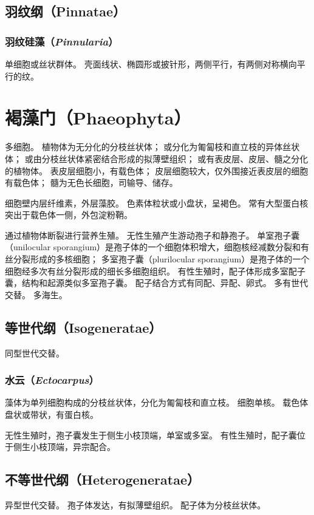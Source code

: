 \documentclass[11pt]{article}
\begin{document}
\subsection{羽纹纲（Pinnatae）}
\subsubsection{羽纹硅藻（\textit{Pinnularia}）}
单细胞或丝状群体。
壳面线状、椭圆形或披针形，两侧平行，有两侧对称横向平行的纹。

\section{褐藻门（Phaeophyta）}
多细胞。
植物体为无分化的分枝丝状体；
或分化为匍匐枝和直立枝的异体丝状体；
或由分枝丝状体紧密结合形成的拟薄壁组织；
或有表皮层、皮层、髓之分化的植物体。
表皮层细胞小，有载色体；
皮层细胞较大，仅外围接近表皮层的细胞有载色体；
髓为无色长细胞，司输导、储存。

\par

细胞壁内层纤维素，外层藻胶。
色素体粒状或小盘状，呈褐色。
常有大型蛋白核突出于载色体一侧，外包淀粉鞘。

\par

通过植物体断裂进行营养生殖。
无性生殖产生游动孢子和静孢子。
单室孢子囊（unilocular sporangium）是孢子体的一个细胞体积增大，细胞核经减数分裂和有丝分裂形成的多核细胞；
多室孢子囊（plurilocular sporangium）是孢子体的一个细胞经多次有丝分裂形成的细长多细胞组织。
有性生殖时，配子体形成多室配子囊，结构和起源类似多室孢子囊。
配子结合方式有同配、异配、卵式。
多有世代交替。
多海生。

\subsection{等世代纲（Isogeneratae）}
同型世代交替。

\subsubsection{水云（\textit{Ectocarpus}）}
藻体为单列细胞构成的分枝丝状体，分化为匍匐枝和直立枝。
细胞单核。
载色体盘状或带状，有蛋白核。

\par

无性生殖时，孢子囊发生于侧生小枝顶端，单室或多室。
有性生殖时，配子囊位于侧生小枝顶端，异宗配合。

\subsection{不等世代纲（Heterogeneratae）}
异型世代交替。
孢子体发达，有拟薄壁组织。
配子体为分枝丝状体。
\end{document}
